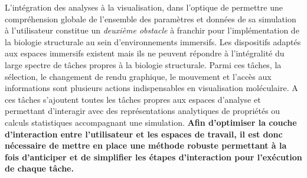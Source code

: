 L'intégration des analyses à la visualisation, dans l'optique de permettre une compréhension globale de l'ensemble des paramètres et données de sa simulation à l'utilisateur constitue un \textit{deuxième obstacle} à franchir pour l'implémentation de la biologie structurale au sein d'environnements immersifs.
Les dispositifs adaptés aux espaces immersifs existent mais ils ne peuvent répondre à l'intégralité du large spectre de tâches propres à la biologie structurale. Parmi ces tâches, la sélection, le changement de rendu graphique, le mouvement et l'accès aux informations sont plusieurs actions indispensables en visualisation moléculaire. A ces tâches s'ajoutent toutes les tâches propres aux espaces d'analyse et permettant d'interagir avec des représentations analytiques de propriétés ou calculs statistiques accompagnant une simulation. 
\textbf{Afin d'optimiser la couche d'interaction entre l'utilisateur et les espaces de travail, il est donc nécessaire de mettre en place une méthode robuste permettant à la fois d'anticiper et de simplifier les étapes d'interaction pour l'exécution de chaque tâche.}



